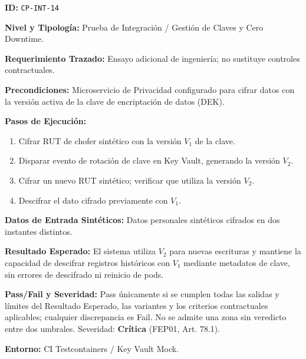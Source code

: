 \par\noindent\textbf{ID:} \texttt{C\allowbreak{}P\allowbreak{}-\allowbreak{}I\allowbreak{}N\allowbreak{}T\allowbreak{}-\allowbreak{}1\allowbreak{}4\allowbreak{}}\par
\par\noindent\textbf{Nivel y Tipología:} Prueba de Integración / Gestión de Claves y Cero Downtime.\par
\par\noindent\textbf{Requerimiento Trazado:} Ensayo adicional de ingeniería; no sustituye controles contractuales.\par
\par\noindent\textbf{Precondiciones:} Microservicio de Privacidad configurado para cifrar datos con la versión activa de la clave de encriptación de datos (DEK).\par
\par\noindent\textbf{Pasos de Ejecución:} \par
\begin{enumerate}
\item Cifrar RUT de chofer sintético con la versión \(V_1\) de la clave.
\item Disparar evento de rotación de clave en Key Vault, generando la versión \(V_2\).
\item Cifrar un nuevo RUT sintético; verificar que utiliza la versión \(V_2\).
\item Descifrar el dato cifrado previamente con \(V_1\).
\end{enumerate}
\par\noindent\textbf{Datos de Entrada Sintéticos:} Datos personales sintéticos cifrados en dos instantes distintos.\par
\par\noindent\textbf{Resultado Esperado:} El sistema utiliza \(V_2\) para nuevas escrituras y mantiene la capacidad de descifrar registros históricos con \(V_1\) mediante metadatos de clave, sin errores de descifrado ni reinicio de pods.\par
\par\noindent\textbf{Pass/Fail y Severidad:} Pass únicamente si se cumplen todas las salidas y límites del Resultado Esperado, las variantes y los criterios contractuales aplicables; cualquier discrepancia es Fail. No se admite una zona sin veredicto entre dos umbrales. Severidad: \textbf{Crítica} (FEP01, Art. 78.1).\par
\par\noindent\textbf{Entorno:} CI Testcontainers / Key Vault Mock.\par






